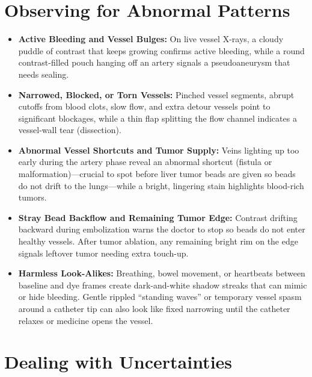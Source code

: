 \section{Observing for Abnormal Patterns}

\begin{itemize}
    \item \textbf{Active Bleeding and Vessel Bulges:} On live vessel X-rays, a cloudy puddle of contrast that keeps growing confirms active bleeding, while a round contrast-filled pouch hanging off an artery signals a pseudoaneurysm that needs sealing.
    \item \textbf{Narrowed, Blocked, or Torn Vessels:} Pinched vessel segments, abrupt cutoffs from blood clots, slow flow, and extra detour vessels point to significant blockages, while a thin flap splitting the flow channel indicates a vessel-wall tear (dissection).
    \item \textbf{Abnormal Vessel Shortcuts and Tumor Supply:} Veins lighting up too early during the artery phase reveal an abnormal shortcut (fistula or malformation)---crucial to spot before liver tumor beads are given so beads do not drift to the lungs---while a bright, lingering stain highlights blood-rich tumors.
    \item \textbf{Stray Bead Backflow and Remaining Tumor Edge:} Contrast drifting backward during embolization warns the doctor to stop so beads do not enter healthy vessels. After tumor ablation, any remaining bright rim on the edge signals leftover tumor needing extra touch-up.
    \item \textbf{Harmless Look-Alikes:} Breathing, bowel movement, or heartbeats between baseline and dye frames create dark-and-white shadow streaks that can mimic or hide bleeding. Gentle rippled ``standing waves'' or temporary vessel spasm around a catheter tip can also look like fixed narrowing until the catheter relaxes or medicine opens the vessel.
\end{itemize}

\section{Dealing with Uncertainties}

